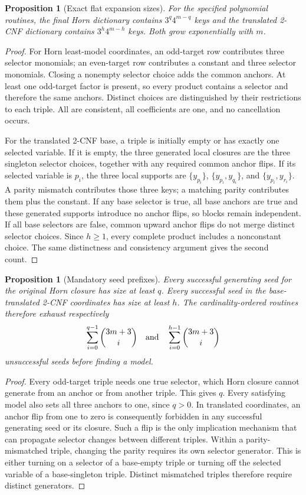 \documentclass[11pt]{article}
\newtheorem{proposition}[theorem]{Proposition}
\begin{document}
\begin{proposition}[Exact flat expansion sizes]
For the specified polynomial routines, the final Horn dictionary contains
\(3^q4^{m-q}\) keys and the translated 2-CNF dictionary contains
\(3^h4^{m-h}\) keys. Both grow exponentially with \(m\).
\end{proposition}
\begin{proof}
For Horn least-model coordinates, an odd-target row contributes three
selector monomials; an even-target row contributes a constant and three
selector monomials. Closing a nonempty selector choice adds the common
anchors. At least one odd-target factor is present, so every product contains
a selector and therefore the same anchors. Distinct choices are distinguished
by their restrictions to each triple. All are consistent, all coefficients
are one, and no cancellation occurs.

For the translated 2-CNF base, a triple is initially empty or has exactly one
selected variable. If it is empty, the three generated local closures are
the three singleton selector choices, together with any required common
anchor flips. If its selected variable is \(p_i\), the three local supports
are \(\{y_{p_i}\}\), \(\{y_{p_i},y_{q_i}\}\), and
\(\{y_{p_i},y_{r_i}\}\). A parity mismatch contributes those three keys;
a matching parity contributes them plus the constant. If any base selector
is true, all base anchors are true and these generated supports introduce
no anchor flips, so blocks remain independent. If all base selectors are
false, common upward anchor flips do not merge distinct selector choices.
Since \(h\ge1\), every complete product includes a nonconstant choice.
The same distinctness and consistency argument gives the second count.
\end{proof}

\begin{proposition}[Mandatory seed prefixes]
Every successful generating seed for the original Horn closure has size at
least \(q\). Every successful seed in the base-translated 2-CNF coordinates
has size at least \(h\). The cardinality-ordered routines therefore exhaust
respectively
\[
 \sum_{i=0}^{q-1}\binom{3m+3}{i}
 \quad\hbox{and}\quad
 \sum_{i=0}^{h-1}\binom{3m+3}{i}
\]
unsuccessful seeds before finding a model.
\end{proposition}
\begin{proof}
Every odd-target triple needs one true selector, which Horn closure cannot
generate from an anchor or from another triple. This gives \(q\).
Every satisfying model also sets all three anchors to one, since \(q>0\).
In translated coordinates, an anchor flip from one to zero is consequently
forbidden in any successful generating seed or its closure. Such a flip is
the only implication mechanism that can propagate selector changes between
different triples. Within a parity-mismatched triple, changing the parity
requires its own selector generator. This is either turning on a selector
of a base-empty triple or turning off the selected variable of a base-singleton
triple. Distinct mismatched triples therefore require distinct generators.
\end{proof}
\end{document}
